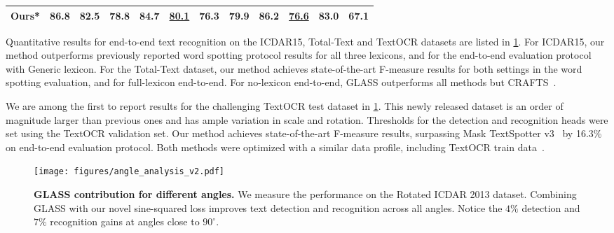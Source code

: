 \documentclass[runningheads]{llncs}
\begin{document}
\begin{table}[t]
{\begin{tabular}{lccccccccccc}
\multicolumn{1}{l}{\textbf{Ours}*} 
&   \textbf{86.8}
&      \textbf{ 82.5 }
&    \textbf{78.8}
&    {84.7}
&     \underline{80.1}
&    \textbf{76.3} 
         & \textbf{79.9} & \textbf{86.2} &  \underline{76.6}
&   \textbf{83.0} & \textbf{67.1}
 \\
\bottomrule
\end{tabular}}
\label{tab:res_icdar_totaltext}
\end{table}

















%
 

Quantitative results for end-to-end text recognition on the ICDAR15, Total-Text and TextOCR datasets are listed in \cref{tab:res_icdar_totaltext}.
For ICDAR15, our method outperforms previously reported word spotting protocol results for all three lexicons, and for the end-to-end evaluation protocol with Generic lexicon. 
For the Total-Text dataset, our method achieves state-of-the-art F-measure results for both settings in the word spotting evaluation, and for full-lexicon end-to-end.
For no-lexicon end-to-end, GLASS outperforms all methods but CRAFTS~\cite{baek2020crafts}.

We are among the first to report results for the challenging TextOCR test dataset in \cref{tab:res_icdar_totaltext}. This newly released dataset is an order of magnitude larger than previous ones and has ample variation in scale and rotation.
Thresholds for the detection and recognition heads were set using the TextOCR validation set.  
Our method achieves state-of-the-art F-measure results, surpassing Mask TextSpotter v3~\cite{liao2020spotterV3} by 16.3\% on end-to-end evaluation protocol.
Both methods were optimized with a similar data profile, including TextOCR train data~\cite{singh2021textocr}.

\begin{figure}[t]
 \centering
  \texttt{[image: figures/angle\_analysis\_v2.pdf]}
\caption{\textbf{GLASS contribution for different angles.}
   We measure the performance on the Rotated ICDAR 2013 dataset.
   Combining GLASS with our novel sine-squared loss improves text detection and recognition across all angles.
   Notice the $4\%$ detection and $7\%$ recognition gains at angles close to $90^{\circ}$. 
   }
  \label{fig:angle_analysis}
\end{figure}
\end{document}

